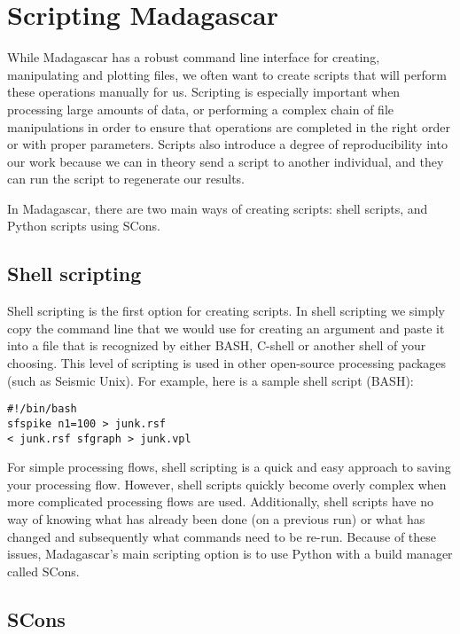 \section{Scripting Madagascar}

While Madagascar has a robust command line interface for creating, manipulating and plotting files, we often want to create scripts that will perform these operations manually for us.  Scripting is especially important when processing large amounts of data, or performing a complex chain of file manipulations in order to ensure that operations are completed in the right order or with proper parameters.  Scripts also introduce a degree of reproducibility into our work because we can in theory send a script to another individual, and they can run the script to regenerate our results.  

In Madagascar, there are two main ways of creating scripts: shell scripts, and Python scripts using SCons.  

\subsection{Shell scripting}

Shell scripting is the first option for creating scripts.  In shell scripting we simply copy the command line that we would use for creating an argument and paste it into a file that is recognized by either BASH, C-shell or another shell of your choosing.  This level of scripting is used in other open-source processing packages (such as Seismic Unix).  For example, here is a sample shell script (BASH):

\begin{verbatim}
#!/bin/bash
sfspike n1=100 > junk.rsf
< junk.rsf sfgraph > junk.vpl
\end{verbatim}

For simple processing flows, shell scripting is a quick and easy approach to saving your processing flow.  However, shell scripts quickly become overly complex when more complicated processing flows are used.  Additionally, shell scripts have no way of knowing what has already been done (on a previous run) or what has changed and subsequently what commands need to be re-run.  Because of these issues, Madagascar's main scripting option is to use Python with a build manager called SCons.

\subsection{SCons}

